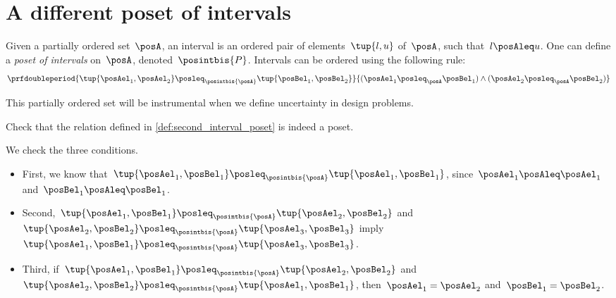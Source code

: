 
\section{A different poset of intervals}
\begin{definition}
    \label{def:second_interval_poset}
    Given a partially ordered set~$\posA$, an interval is an ordered pair of elements~$\tup{l,u}$ of~$\posA$, such that~$l\posAleq u$.
    One can define a \emph{poset of intervals} on~$\posA$, denoted~$\posintbis{P}$.
    Intervals can be ordered using the following rule:
    \begin{equation}
        \prfdoubleperiod{\tup{\posAel_1,\posAel_2}\posleq_{\posintbis{\posA}}\tup{\posBel_1,\posBel_2}}{(\posAel_1\posleq_\posA \posBel_1) \wedge (\posAel_2\posleq_\posA \posBel_2)}
    \end{equation}
\end{definition}

This partially ordered set will be instrumental when we define uncertainty in design problems.

\begin{exercise}
    Check that the relation defined in \cref{def:second_interval_poset} is indeed a poset.
\end{exercise}
\begin{solution}
    We check the three conditions.
    \begin{itemize}
        \item First, we know that~$\tup{\posAel_1,\posBel_1}\posleq_{\posintbis{\posA}}\tup{\posAel_1,\posBel_1}$, since~$\posAel_1\posAleq \posAel_1$ and~$\posBel_1\posAleq \posBel_1$.
        \item Second,~$\tup{\posAel_1,\posBel_1}\posleq_{\posintbis{\posA}}\tup{\posAel_2,\posBel_2}$ and~$\tup{\posAel_2,\posBel_2}\posleq_{\posintbis{\posA}}\tup{\posAel_3,\posBel_3}$ imply~$\tup{\posAel_1,\posBel_1}\posleq_{\posintbis{\posA}}\tup{\posAel_3,\posBel_3}$.
        \item Third, if~$\tup{\posAel_1,\posBel_1}\posleq_{\posintbis{\posA}}\tup{\posAel_2,\posBel_2}$ and~$\tup{\posAel_2,\posBel_2}\posleq_{\posintbis{\posA}}\tup{\posAel_1,\posBel_1}$, then~$\posAel_1=\posAel_2$ and~$\posBel_1=\posBel_2$.
    \end{itemize}
\end{solution}
